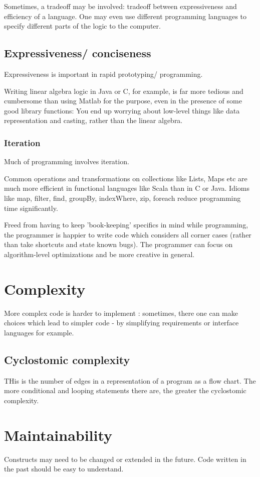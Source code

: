 \documentclass[oneside, article]{memoir}
\begin{document}
Sometimes, a tradeoff may be involved: tradeoff between expressiveness and efficiency of a language. One may even use different programming languages to specify different parts of the logic to the computer.

\subsection{Expressiveness/ conciseness}
Expressiveness is important in rapid prototyping/ programming.

Writing linear algebra logic in Java or C, for example, is far more tedious and cumbersome than using Matlab for the purpose, even in the presence of some good library functions: You end up worrying about low-level things like data representation and casting, rather than the linear algebra.

\subsubsection{Iteration}
Much of programming involves iteration.

Common operations and transformations on collections like Lists, Maps etc are much more efficient in functional languages like Scala than in C or Java. Idioms like map, filter, find, groupBy, indexWhere, zip, foreach reduce programming time significantly.

Freed from having to keep 'book-keeping' specifics in mind while programming, the programmer is happier to write code which considers all corner cases (rather than take shortcuts and state known bugs). The programmer can focus on algorithm-level optimizations and be more creative in general.

\section{Complexity}
More complex code is harder to implement : sometimes, there one can make choices which lead to simpler code - by simplifying requirements or interface languages for example.

\subsection{Cyclostomic complexity}
THis is the number of edges in a representation of a program as a flow chart. The more conditional and looping statements there are, the greater the cyclostomic complexity.

\section{Maintainability}
Constructs may need to be changed or extended in the future. Code written in the past should be easy to understand.
\end{document}
